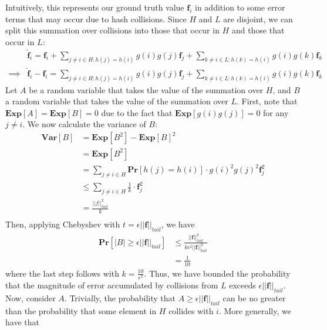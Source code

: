 \documentclass[12pt]{article}
\begin{document}
\begin{solution}
    Intuitively, this represents our ground truth value $\textbf{f}_i$ in addition to some error terms that may occur due to hash collisions. Since $H$ and $L$ are disjoint, we can split this summation over collisions into those that occur in $H$ and those that occur in $L$:
    \begin{align*}
        &\hat{\textbf{f}}_i = \textbf{f}_i + \sum\limits_{j \neq i \in H: h(j) = h(i)} g(i)g(j)\textbf{f}_j + \sum\limits_{k \neq i \in L: h(k) = h(i)} g(i)g(k)\textbf{f}_k \\
        \implies &\hat{\textbf{f}}_i - \textbf{f}_i = \sum\limits_{j \neq i \in H: h(j) = h(i)} g(i)g(j)\textbf{f}_j + \sum\limits_{k \neq i \in L: h(k) = h(i)} g(i)g(k)\textbf{f}_k
    \end{align*}
    Let $A$ be a random variable that takes the value of the summation over $H$, and $B$ a random variable that takes the value of the summation over $L$. First, note that $\textbf{Exp}[A] = \textbf{Exp}[B] = 0$ due to the fact that $\textbf{Exp}[g(i)g(j)] = 0$ for any $j \neq i$. We now calculate the variance of $B$:
    \begin{align*}
        \textbf{Var}[B] &= \textbf{Exp}[B^2] - \textbf{Exp}[B]^2 \\
        &= \textbf{Exp}[B^2] \\
        &= \sum\limits_{j \neq i \in H} \textbf{Pr}[h(j) = h(i)] \cdot g(i)^2g(j)^2\textbf{f}_j^2 \\
        &\leq \sum\limits_{j \neq i \in H} \frac{1}{k} \cdot \textbf{f}_j^2 \\
        &= \frac{||f||_{tail}^2}{k} \\ 
    \end{align*}
    Then, applying Chebyshev with $t = \epsilon ||\textbf{f}||_{tail}$, we have
    \begin{align*}
        \textbf{Pr}[|B| \geq \epsilon ||\textbf{f}||_{tail}] &\leq \frac{||\textbf{f}||_{tail}^2}{k\epsilon^2||\textbf{f}||_{tail}^2} \\
        &= \frac{1}{10}
    \end{align*}
    where the last step follows with $k = \frac{10}{\epsilon^2}$. Thus, we have bounded the probability that the magnitude of error accumulated by collisions from $L$ exceeds $\epsilon||\textbf{f}||_{tail}$. Now, consider $A$. Trivially, the probability that $A \geq \epsilon ||\textbf{f}||_{tail}$ can be no greater than the probability that some element in $H$ collides with $i$. More generally, we have that
    \begin{align*}

\end{align*}
\end{solution}
\end{document}
